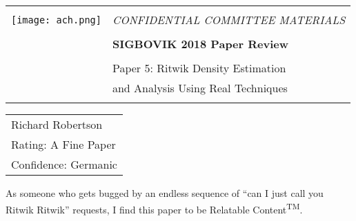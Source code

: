\documentclass[12pt]{article}
\begin{document}
{\sffamily
\begin{tabular}{ll}
\multirow{3}{*}{\texttt{[image: ach.png]}}\\
& \Large{\em CONFIDENTIAL COMMITTEE MATERIALS} \\
&\\
& \textbf{\Huge{SIGBOVIK 2018 Paper Review}} \\
&\\
& \LARGE{Paper 5: Ritwik Density Estimation} \\[0.25em]
& \LARGE{and Analysis Using Real Techniques} \\
&\\
\hline
\end{tabular}}
\vspace{2em}
\thispagestyle{empty}

{\large\bf
\begin{tabular}{l}
Richard Robertson \\
Rating: A Fine Paper \\
Confidence: Germanic \\
\end{tabular}}
\vspace{1em}

As someone who gets bugged by an endless sequence of
``can I just call you Ritwik Ritwik'' requests,
I find this paper to be Relatable Content\textsuperscript{TM}.
\end{document}

